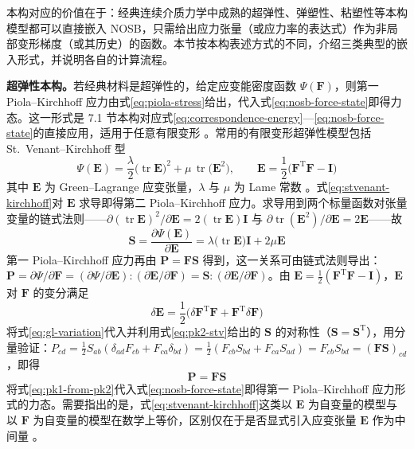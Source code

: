 本构对应的价值在于：经典连续介质力学中成熟的超弹性、弹塑性、粘塑性等本构模型都可以直接嵌入 NOSB，只需给出应力张量（或应力率的表达式）作为非局部变形梯度（或其历史）的函数。本节按本构表述方式的不同，介绍三类典型的嵌入形式，并说明各自的计算流程。

\textbf{超弹性本构。}若经典材料是超弹性的，给定应变能密度函数 $\Psi(\mathbf{F})$，则第一 Piola–Kirchhoff 应力由式\eqref{eq:piola-stress}给出，代入式\eqref{eq:nosb-force-state}即得力态。这一形式是 7.1 节本构对应式\eqref{eq:correspondence-energy}—\eqref{eq:nosb-force-state}的直接应用，适用于任意有限变形 \cite{Silling2007}。常用的有限变形超弹性模型包括 St.~Venant–Kirchhoff 型
\begin{equation}
  \Psi(\mathbf{E})=\frac{\lambda}{2}\bigl(\operatorname{tr}\mathbf{E}\bigr)^{2}+\mu\,\operatorname{tr}\bigl(\mathbf{E}^{2}\bigr),\qquad
  \mathbf{E}=\frac{1}{2}\bigl(\mathbf{F}^{\mathrm{T}}\mathbf{F}-\mathbf{I}\bigr)
  \label{eq:stvenant-kirchhoff}
\end{equation}
其中 $\mathbf{E}$ 为 Green–Lagrange 应变张量，$\lambda$ 与 $\mu$ 为 Lame 常数 \cite{Silling2007,MadenciOterkus2014}。式\eqref{eq:stvenant-kirchhoff}对 $\mathbf{E}$ 求导即得第二 Piola–Kirchhoff 应力。求导用到两个标量函数对张量变量的链式法则——$\partial(\operatorname{tr}\mathbf{E})^{2}/\partial\mathbf{E}=2(\operatorname{tr}\mathbf{E})\mathbf{I}$ 与 $\partial\operatorname{tr}(\mathbf{E}^{2})/\partial\mathbf{E}=2\mathbf{E}$——故
\begin{equation}
  \mathbf{S}=\frac{\partial\Psi(\mathbf{E})}{\partial\mathbf{E}}
  =\lambda\bigl(\operatorname{tr}\mathbf{E}\bigr)\mathbf{I}+2\mu\mathbf{E}
  \label{eq:pk2-stv}
\end{equation}
第一 Piola–Kirchhoff 应力再由 $\mathbf{P}=\mathbf{F}\mathbf{S}$ 得到，这一关系可由链式法则导出：$\mathbf{P}=\partial\Psi/\partial\mathbf{F}=(\partial\Psi/\partial\mathbf{E}):(\partial\mathbf{E}/\partial\mathbf{F})=\mathbf{S}:(\partial\mathbf{E}/\partial\mathbf{F})$。由 $\mathbf{E}=\tfrac{1}{2}(\mathbf{F}^{\mathrm{T}}\mathbf{F}-\mathbf{I})$，$\mathbf{E}$ 对 $\mathbf{F}$ 的变分满足
\begin{equation}
  \delta\mathbf{E}=\frac{1}{2}\bigl(\delta\mathbf{F}^{\mathrm{T}}\mathbf{F}+\mathbf{F}^{\mathrm{T}}\delta\mathbf{F}\bigr)
  \label{eq:gl-variation}
\end{equation}
将式\eqref{eq:gl-variation}代入并利用式\eqref{eq:pk2-stv}给出的 $\mathbf{S}$ 的对称性（$\mathbf{S}=\mathbf{S}^{\mathrm{T}}$），用分量验证：$P_{cd}=\tfrac{1}{2}S_{ab}(\delta_{ad}F_{cb}+F_{ca}\delta_{bd})=\tfrac{1}{2}(F_{cb}S_{bd}+F_{ca}S_{ad})=F_{cb}S_{bd}=(\mathbf{F}\mathbf{S})_{cd}$，即得
\begin{equation}
  \mathbf{P}=\mathbf{F}\mathbf{S}
  \label{eq:pk1-from-pk2}
\end{equation}
将式\eqref{eq:pk1-from-pk2}代入式\eqref{eq:nosb-force-state}即得第一 Piola–Kirchhoff 应力形式的力态。需要指出的是，式\eqref{eq:stvenant-kirchhoff}这类以 $\mathbf{E}$ 为自变量的模型与以 $\mathbf{F}$ 为自变量的模型在数学上等价，区别仅在于是否显式引入应变张量 $\mathbf{E}$ 作为中间量 \cite{Silling2007}。

